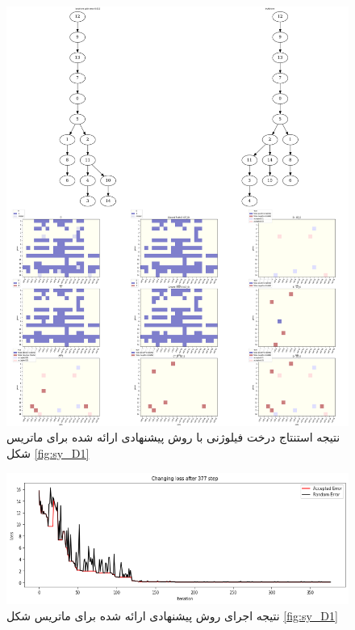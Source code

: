 \begin{figure}[!ht]
	\centering
	\includegraphics[height=0.8\textheight]{img/chaps/er/PM_s_tree}
	\caption{‌نتیجه استنتاج درخت فیلوژنی با روش پیشنهادی ارائه شده برای ماتریس شکل \ref*{fig:sy_D1}}
	\label{fig:sy_benchmark_pm}
\end{figure}

\begin{figure}[!ht]
\centering
\includegraphics[height=0.25\textheight]{img/chaps/er/PM_s_chart}
\caption{‌نتیجه اجرای روش پیشنهادی ارائه شده برای ماتریس شکل \ref*{fig:sy_D1}}
\label{fig:sy_benchmark_pm_chart}
\end{figure}

